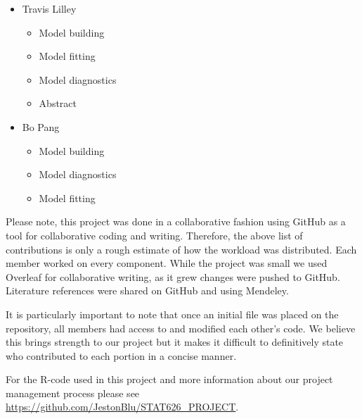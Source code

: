 \documentclass[twoside,twocolumn]{article}
\begin{document}
\begin{itemize}
	\item Travis Lilley
			 \begin{itemize}
			 \item Model building
			 \item Model fitting
			 \item Model diagnostics
			 \item Abstract
			 \end{itemize}

	\item{Bo Pang}
		\begin{itemize}
					\item Model building
		 			\item Model diagnostics
		 			\item Model fitting
		\end{itemize}
 \end{itemize}

Please note, this project was done in a collaborative fashion using GitHub as a tool for collaborative coding and writing. Therefore, the above list of contributions is only a rough estimate of how the workload was distributed. Each member worked on every component.  While the project was small we used Overleaf for collaborative writing, as it grew changes were pushed to GitHub.  Literature references were shared on GitHub and using Mendeley.

It is particularly important to note that once an initial file was placed on the repository, all members had access to and modified each other's code. We believe this brings strength to our project but it makes it difficult to definitively state who contributed to each portion in a concise manner.

For  the R-code used in this project and more information about our project management process please see \url{https://github.com/JestonBlu/STAT626_PROJECT}.
\end{document}

